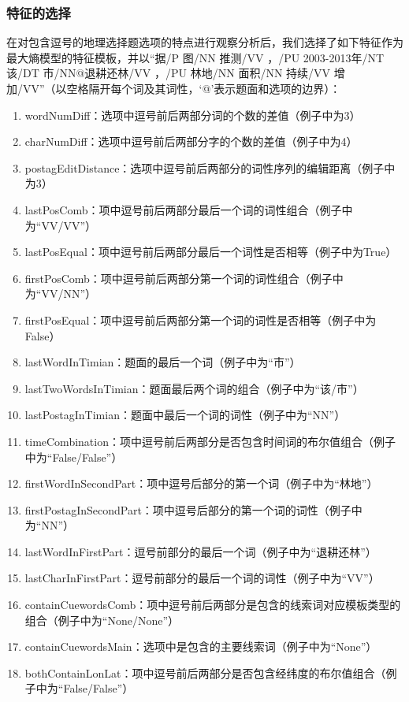 \documentclass[master, winfont]{njuthesis}
\begin{document}
\subsubsection{特征的选择}
在对包含逗号的地理选择题选项的特点进行观察分析后，我们选择了如下特征作为最大熵模型的特征模板，并以“据/P 图/NN 推测/VV ，/PU 2003-2013年/NT 该/DT 市/NN@退耕还林/VV ，/PU 林地/NN 面积/NN 持续/VV 增加/VV”（以空格隔开每个词及其词性，‘@’表示题面和选项的边界）：
\begin{enumerate}
  \item wordNumDiff：选项中逗号前后两部分词的个数的差值（例子中为3）
  \item charNumDiff：选项中逗号前后两部分字的个数的差值（例子中为4）
  \item postagEditDistance：选项中逗号前后两部分的词性序列的编辑距离（例子中为3）
  \item lastPosComb：项中逗号前后两部分最后一个词的词性组合（例子中为“VV/VV”）
  \item lastPosEqual：项中逗号前后两部分最后一个词性是否相等（例子中为True）
  \item firstPosComb：项中逗号前后两部分第一个词的词性组合（例子中为“VV/NN”）
  \item firstPosEqual：项中逗号前后两部分第一个词的词性是否相等（例子中为False）
  \item lastWordInTimian：题面的最后一个词（例子中为“市”）
  \item lastTwoWordsInTimian：题面最后两个词的组合（例子中为“该/市”）
  \item lastPostagInTimian：题面中最后一个词的词性（例子中为“NN”）
  \item timeCombination：项中逗号前后两部分是否包含时间词的布尔值组合（例子中为“False/False”）
  \item firstWordInSecondPart：项中逗号后部分的第一个词（例子中为“林地”）
  \item firstPostagInSecondPart：项中逗号后部分的第一个词的词性（例子中为“NN”）
  \item lastWordInFirstPart：逗号前部分的最后一个词（例子中为“退耕还林”）
  \item lastCharInFirstPart：逗号前部分的最后一个词的词性（例子中为“VV”）
  \item containCuewordsComb：项中逗号前后两部分是包含的线索词对应模板类型的组合（例子中为“None/None”）
  \item containCuewordsMain：选项中是包含的主要线索词（例子中为“None”）
  \item bothContainLonLat：项中逗号前后两部分是否包含经纬度的布尔值组合（例子中为“False/False”）
\end{enumerate}
\end{document}
